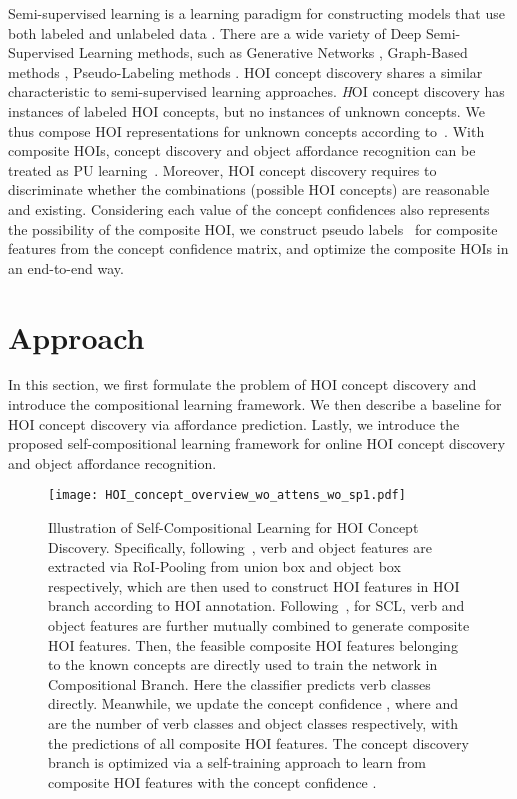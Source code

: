 \documentclass[runningheads]{llncs}
\begin{document}
Semi-supervised learning is a learning paradigm for constructing models that use both labeled and unlabeled data \cite{yang2021survey}. There are a wide variety of Deep Semi-Supervised Learning methods, such as Generative Networks \cite{kingma2014semi,springenberg2015unsupervised}, Graph-Based methods \cite{wang2016structural,gilmer2017neural}, Pseudo-Labeling methods \cite{lee2013pseudo,xie2020self,hinton2015distilling}. HOI concept discovery shares a similar characteristic to semi-supervised learning approaches. {\textit HOI concept discovery has instances of labeled HOI concepts, but no instances of unknown concepts.} We thus compose HOI representations for unknown concepts according to~\cite{scudder1965probability}. With composite HOIs, concept discovery and object affordance recognition can be treated as PU learning~\cite{de1999positive}. Moreover, HOI concept discovery requires to discriminate whether the combinations (possible HOI concepts) are reasonable and existing. Considering each value of the concept confidences also represents the possibility of the composite HOI, we construct pseudo labels~\cite{lee2013pseudo,scudder1965probability} for composite features from the concept confidence matrix, and optimize the composite HOIs in an end-to-end way.




\section{Approach}

In this section, we first formulate the problem of HOI concept discovery and introduce the compositional learning framework. We then describe a baseline for HOI concept discovery via affordance prediction. Lastly, we introduce the proposed self-compositional learning framework for online HOI concept discovery and object affordance recognition.


\begin{figure*}[!ht]
  \centering
  \texttt{[image: HOI\_concept\_overview\_wo\_attens\_wo\_sp1.pdf]}
  \caption{Illustration of Self-Compositional Learning for HOI Concept Discovery. Specifically, following~\cite{hou2020visual}, verb and object features are extracted via RoI-Pooling from union box and object box respectively, which are then used to construct HOI features in HOI branch according to HOI annotation. Following~\cite{hou2020visual}, for SCL, verb and object features are further mutually combined to generate composite HOI features. Then, the feasible composite HOI features belonging to the known concepts are directly used to train the network in Compositional Branch. Here the classifier predicts verb classes directly. Meanwhile, we update the concept confidence , where  and  are the number of verb classes and object classes respectively, with the predictions of all composite HOI features. The concept discovery branch is optimized via a self-training approach to learn from composite HOI features with the concept confidence .}
  \label{fig:overview}
\end{figure*}
\end{document}
